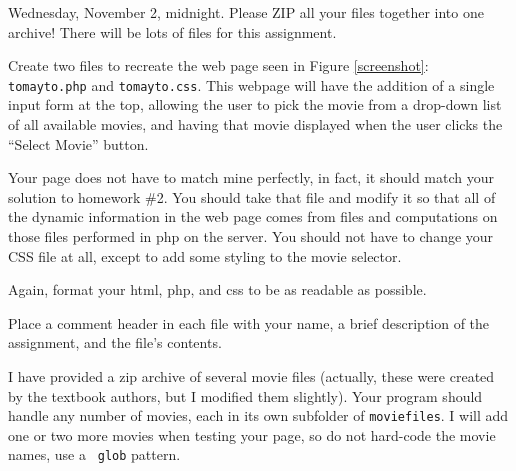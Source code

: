 \documentclass{article}
\newcommand{\myitem}[1]{\noindent\hspace{-.25in}{\bf #1}}
\begin{document}
\myitem{CSCI 342, Fall 2016, Homework \# 3}

\myitem{Due date:}
Wednesday, November 2, midnight.  Please ZIP all your files
together into one archive!  There will be lots of files for this
assignment.  

\myitem{Instructions:}
Create two files to recreate the web page seen
in Figure \ref{screenshot}:
{\tt tomayto.php} and
{\tt tomayto.css}.
This webpage will have the addition of a single input form at the top,
allowing the user to pick the movie from a drop-down list of all
available movies, and having that movie displayed when the user clicks
the ``Select Movie'' button.

Your page does not have to match mine perfectly, in fact, it should
match your solution to homework \#2.  You should take that file and
modify it so that all of the dynamic information in the web page comes
from files and computations on those files performed in php on the
server.  You should not have to change your CSS file at all, except to
add some styling to the movie selector.

Again, format your html, php, and css to be as readable as
possible. 

Place a comment header in each file with your name, a brief
description of the assignment, and the file's contents.

\myitem{Movie files:}
I have provided a zip archive of several movie files (actually, these
were created by the textbook authors, but I modified them slightly).
Your program should handle any number of movies, each in its own
subfolder of {\tt moviefiles}.  I will add one or two more movies when
testing your page, so do not hard-code the movie names, use a {\tt
  glob} pattern.
\end{document}

